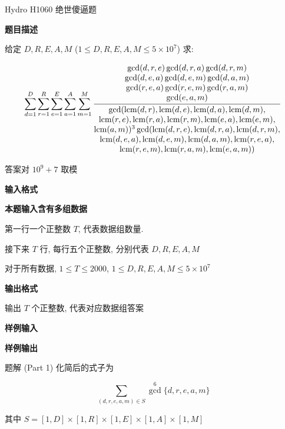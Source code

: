 \begin{frame}{Hydro H1060 绝世傻逼题}
	\label{prime:example:hydroh1060}

	\textbf{题目描述}

	给定 \(D,R,E,A,M\) (\(1\le D,R,E,A,M\le5\times10^7\)) 求:

	\begin{equation}
		\sum_{d=1}^D\sum_{r=1}^R\sum_{e=1}^E\sum_{a=1}^A\sum_{m=1}^M\frac{\begin{matrix}
				\gcd(d,r,e)\gcd(d,r,a)\gcd(d,r,m) \\
				\gcd(d,e,a)\gcd(d,e,m)\gcd(d,a,m) \\
				\gcd(r,e,a)\gcd(r,e,m)\gcd(r,a,m) \\
				\gcd(e,a,m)
			\end{matrix}}{\begin{matrix}
				\gcd(\operatorname{lcm}(d,r),\operatorname{lcm}(d,e),\operatorname{lcm}(d,a),\operatorname{lcm}(d,m),         \\
				\operatorname{lcm}(r,e),\operatorname{lcm}(r,a),\operatorname{lcm}(r,m),\operatorname{lcm}(e,a),\operatorname{lcm}(e,m),    \\
				\operatorname{lcm}(a,m))^3\gcd(\operatorname{lcm}(d,r,e),\operatorname{lcm}(d,r,a),\operatorname{lcm}(d,r,m), \\
				\operatorname{lcm}(d,e,a),\operatorname{lcm}(d,e,m),\operatorname{lcm}(d,a,m),\operatorname{lcm}(r,e,a),      \\
				\operatorname{lcm}(r,e,m),\operatorname{lcm}(r,a,m),\operatorname{lcm}(e,a,m))
			\end{matrix}}
	\end{equation}

	答案对 \(10^9+7\) 取模

	\textbf{输入格式}

	\textbf{本题输入含有多组数据}

	第一行一个正整数 \(T\), 代表数据组数量.

	接下来 \(T\) 行, 每行五个正整数, 分别代表 \(D,R,E,A,M\)

	对于所有数据, \(1\le T\le2000\), \(1\le D,R,E,A,M\le5\times10^7\)

	\textbf{输出格式}

	输出 \(T\) 个正整数, 代表对应数据组答案

	\textbf{样例输入}


	\textbf{样例输出}

\end{frame}


\begin{frame}{题解 (Part 1)}
	化简后的式子为

	\begin{equation}
		\label{prime:eq:hydroh1060-1}
		\sum_{(d,r,e,a,m)\in S}{\gcd}^6\{d,r,e,a,m\}
	\end{equation}

	其中 \(S=[1,D]\times[1,R]\times[1,E]\times[1,A]\times[1,M]\)
\end{frame}

